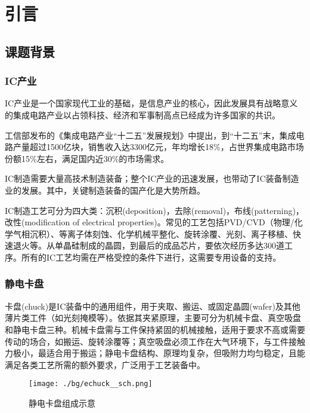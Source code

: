 \chapter{引言}\label{ch:bg}



\section{课题背景}



\subsection{IC产业}

IC产业是一个国家现代工业的基础，是信息产业的核心，因此发展具有战略意义的集成电路产业以占领科技、经济和军事制高点已经成为许多国家的共识。

工信部发布的《集成电路产业“十二五”发展规划》中提出，到“十二五”末，集成电路产量超过1500亿块，销售收入达3300亿元，年均增长18\%，占世界集成电路市场份额15\%左右，满足国内近30\%的市场需求。

IC制造需要大量高技术制造装备；整个IC产业的迅速发展，也带动了IC装备制造业的发展。其中，关键制造装备的国产化是大势所趋。

IC制造工艺可分为四大类：沉积(deposition)，去除(removal)，布线(patterning)，改性(modification of electrical properties)。常见的工艺包括PVD/CVD（物理/化学气相沉积）、等离子体刻蚀、化学机械平整化、旋转涂覆、光刻、离子移植、快速退火等。从单晶硅制成的晶圆，到最后的成品芯片，要依次经历多达300道工序。所有的IC工艺均需在严格受控的条件下进行，这需要专用设备的支持。


\subsection{静电卡盘}\label{sec:intro-echuck}

卡盘(chuck)是IC装备中的通用组件，用于夹取、搬运、或固定晶圆(wafer)及其他薄片类工件（如光刻掩模等）。依据其夹紧原理，主要可分为机械卡盘、真空吸盘和静电卡盘三种。机械卡盘需与工件保持紧固的机械接触，适用于要求不高或需要传动的场合，如搬运、旋转涂覆等；真空吸盘必须工作在大气环境下，与工件接触力极小，最适合用于搬运；静电卡盘结构、原理均复杂，但吸附力均匀稳定，且能满足各类工艺所需的额外要求，广泛用于工艺装备中。

\begin{figure}[hbt]
\centering
\texttt{[image: ./bg/echuck\_\_sch.png]}
\caption{静电卡盘组成示意}
\label{fig:echuck__sch}
\end{figure}

